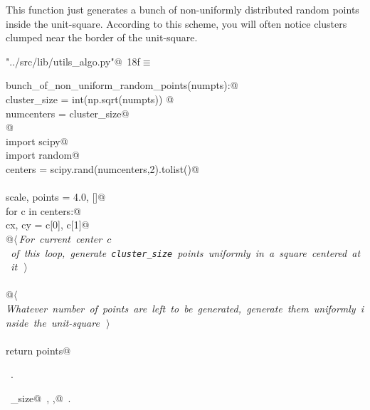 \documentclass[11.5pt]{report}
\begin{document}
\vspace{-0.8cm} \newchunk This function just generates a bunch of non-uniformly distributed
random points inside the unit-square. According to this scheme, you will often notice
clusters clumped near the border of the unit-square. 
\begin{flushleft} \small\label{scrap19}\raggedright\small
{} \verb@"../src/lib/utils_algo.py"@\nobreak\ {\footnotesize {18f}}$\equiv$
\vspace{-1ex}
\begin{list}{}{} \item
\mbox{}\verb@def bunch_of_non_uniform_random_points(numpts):@\\
\mbox{}\verb@    cluster_size = int(np.sqrt(numpts)) @\\
\mbox{}\verb@    numcenters   = cluster_size@\\
\mbox{}\verb@    @\\
\mbox{}\verb@    import scipy@\\
\mbox{}\verb@    import random@\\
\mbox{}\verb@    centers = scipy.rand(numcenters,2).tolist()@\\
\mbox{}\verb@@\\
\mbox{}\verb@    scale, points = 4.0, []@\\
\mbox{}\verb@    for c in centers:@\\
\mbox{}\verb@        cx, cy = c[0], c[1]@\\
\mbox{}\verb@        @\hbox{$\langle\,${\itshape For current center $c$ of this loop, generate \verb|cluster_size| points uniformly in a square centered at it}\nobreak\ {\footnotesize {}}$\,\rangle$}\verb@@\\
\mbox{}\verb@@\\
\mbox{}\verb@    @\hbox{$\langle\,${\itshape Whatever number of points are left to be generated, generate them uniformly inside the unit-square}\nobreak\ {\footnotesize {}}$\,\rangle$}\verb@@\\
\mbox{}\verb@@\\
\mbox{}\verb@    return points@\\
\mbox{}\verb@@{\NWsep}
\end{list}
\vspace{-1.5ex}
\footnotesize
\begin{list}{}{\setlength{\itemsep}{-\parsep}\setlength{\itemindent}{-\leftmargin}}
\item \NWtxtFileDefBy\ .
\item \NWtxtIdentsDefed\nobreak\  \verb@cluster_size@\nobreak\ , \verb@scale,@\nobreak\ .
\item{}
\end{list}
\vspace{4ex}
\end{flushleft}
\end{document}
